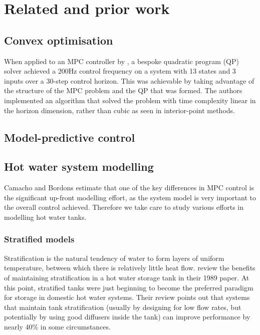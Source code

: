 \chapter{Related and prior work}

\section{Convex optimisation}


When applied to an MPC controller by \textcite{Wang10}, a bespoke quadratic program (QP) solver achieved a 200Hz control frequency on a system with 13 states and 3 inputs over a 30-step control horizon.
This was achievable by taking advantage of the structure of the MPC problem and the QP that was formed.
The authors implemented an algorithm that solved the problem with time complexity linear in the horizon dimension, rather than cubic as seen in interior-point methods.

\section{Model-predictive control}


\section{Hot water system modelling}

Camacho and Bordons estimate that one of the key differences in MPC control is the significant up-front modelling effort, as the system model is very important to the overall control achieved.
Therefore we take care to study various efforts in modelling hot water tanks.

\subsection{Stratified models}
\label{sec:review:stratified-tank-models}

Stratification is the natural tendency of water to form layers of uniform temperature, between which there is relatively little heat flow.
\textcite{Hollands89} review the benefits of maintaining stratification in a
hot water storage tank in their 1989 paper.
At this point, stratified tanks were just beginning to become the preferred paradigm for storage in domestic hot water systems.
Their review points out that systems that maintain tank stratification (usually by designing for low flow rates, but potentially by using good diffusers inside the tank) can improve performance by nearly 40\% in some circumstances.

